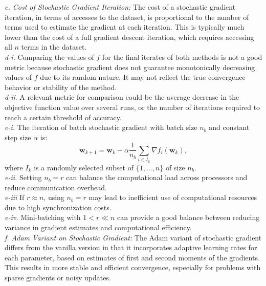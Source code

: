 \documentclass[12pt]{article}
\begin{document}
    \textit{c. Cost of Stochastic Gradient Iteration:}
    The cost of a stochastic gradient iteration, in terms of accesses to the dataset, is proportional to the number of terms used to estimate the gradient at each iteration. This is typically much lower than the cost of a full gradient descent iteration, which requires accessing all \(n\) terms in the dataset.\\

    \textit{d-i.} Comparing the values of \(f\) for the final iterates of both methods is not a good metric because stochastic gradient does not guarantee monotonically decreasing values of \(f\) due to its random nature. It may not reflect the true convergence behavior or stability of the method.\\

    \textit{d-ii}. A relevant metric for comparison could be the average decrease in the objective function value over several runs, or the number of iterations required to reach a certain threshold of accuracy.\\

    \textit{e-i.} The iteration of batch stochastic gradient with batch size \(n_b\) and constant step size \(\alpha\) is:
    \[
        \boldsymbol{w}_{k+1} = \boldsymbol{w}_k - \alpha \frac{1}{n_b} \sum_{i \in I_k} \nabla f_i(\boldsymbol{w}_k),
    \]
    where \(I_k\) is a randomly selected subset of \(\{1, \ldots, n\}\) of size \(n_b\).\\

    \textit{e-ii.} Setting \(n_b = r\) can balance the computational load across processors and reduce communication overhead.\\

    \textit{e-iii} If \(r \approx n\), using \(n_b = r\) may lead to inefficient use of computational resources due to high synchronization costs.\\

    \textit{e-iv.} Mini-batching with \(1 < r \ll n\) can provide a good balance between reducing variance in gradient estimates and computational efficiency.\\

    \textit{f. Adam Variant on Stochastic Gradient:}
    The Adam variant of stochastic gradient differs from the vanilla version in that it incorporates adaptive learning rates for each parameter, based on estimates of first and second moments of the gradients. This results in more stable and efficient convergence, especially for problems with sparse gradients or noisy updates.
\end{document}

